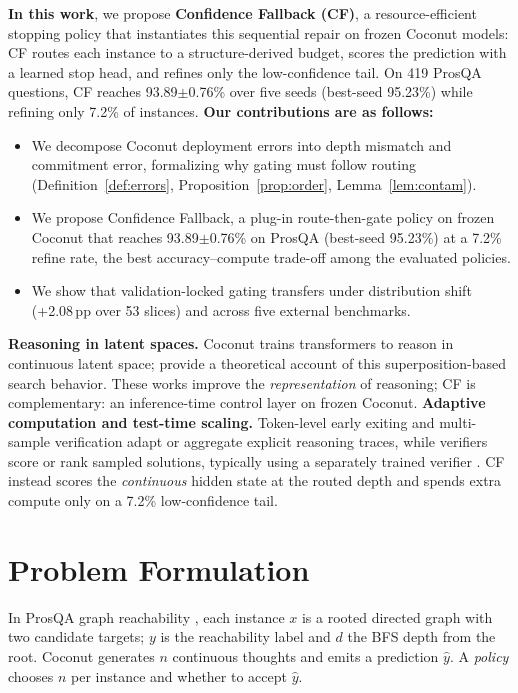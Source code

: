 \documentclass{article}
\theoremstyle{compactthm}
\theoremstyle{compactdef}
\begin{document}
\textbf{In this work}, we propose \textbf{Confidence Fallback (CF)}, a resource-efficient stopping policy that instantiates this sequential repair on frozen Coconut models: CF routes each instance to a structure-derived budget, scores the prediction with a learned stop head, and refines only the low-confidence tail. On 419 ProsQA questions, CF reaches 93.89$\pm$0.76\% over five seeds (best-seed 95.23\%) while refining only 7.2\% of instances. \textbf{Our contributions are as follows:}
\begin{itemize}\setlength{\itemsep}{0pt}\setlength{\parskip}{0pt}
\item We decompose Coconut deployment errors into depth mismatch and commitment error, formalizing why gating must follow routing (Definition~\ref{def:errors}, Proposition~\ref{prop:order}, Lemma~\ref{lem:contam}).
\item We propose Confidence Fallback, a plug-in route-then-gate policy on frozen Coconut that reaches 93.89$\pm$0.76\% on ProsQA (best-seed 95.23\%) at a 7.2\% refine rate, the best accuracy--compute trade-off among the evaluated policies.
\item We show that validation-locked gating transfers under distribution shift (+2.08\,pp over 53 slices) and across five external benchmarks.
\end{itemize}

\noindent\textbf{Reasoning in latent spaces.} Coconut \citep{hao2024coconut} trains transformers to reason in continuous latent space; \citet{zhu2025superposition} provide a theoretical account of this superposition-based search behavior. These works improve the \emph{representation} of reasoning; CF is complementary: an inference-time control layer on frozen Coconut. \textbf{Adaptive computation and test-time scaling.} Token-level early exiting and multi-sample verification adapt or aggregate explicit reasoning traces, while verifiers score or rank sampled solutions, typically using a separately trained verifier \citep{cobbe2021training}. CF instead scores the \emph{continuous} hidden state at the routed depth and spends extra compute only on a 7.2\% low-confidence tail.

\section{Problem Formulation}
\label{sec:problem}
In ProsQA graph reachability \citep{hao2024coconut}, each instance $x$ is a rooted directed graph with two candidate targets; $y$ is the reachability label and $d$ the BFS depth from the root. Coconut generates $n$ continuous thoughts and emits a prediction $\hat y$. A \emph{policy} chooses $n$ per instance and whether to accept $\hat y$.
\end{document}
